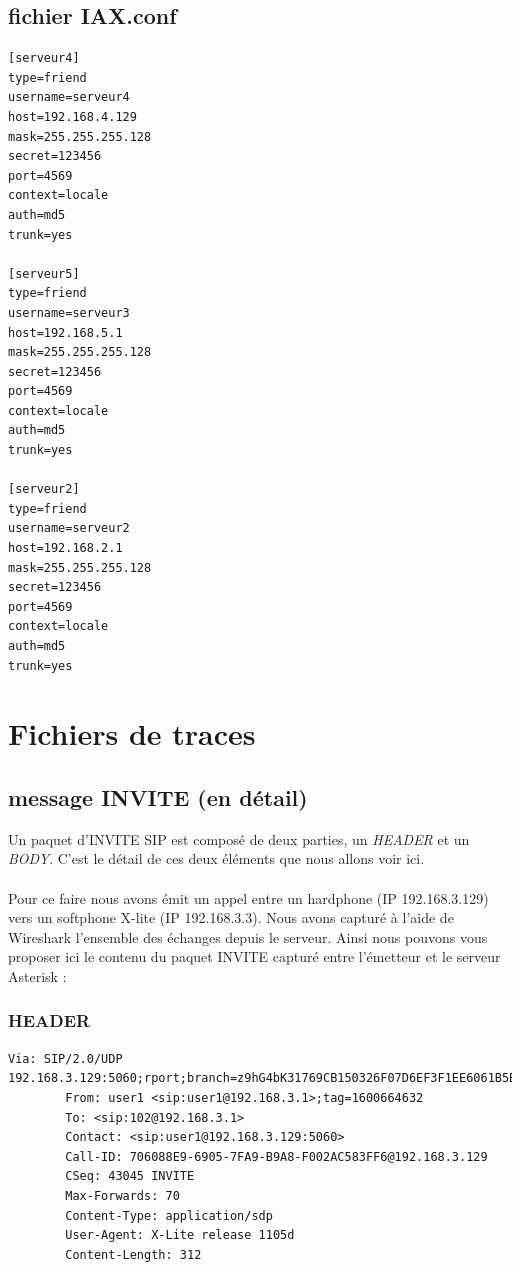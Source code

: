 \documentclass[12pt,a4paper,notitlepage]{article}
\begin{document}
\subsection{fichier IAX.conf}

\begin{lstlisting}[title=Fichier IAX.conf]
[serveur4]
type=friend
username=serveur4
host=192.168.4.129
mask=255.255.255.128
secret=123456
port=4569
context=locale
auth=md5
trunk=yes

[serveur5]
type=friend
username=serveur3
host=192.168.5.1
mask=255.255.255.128
secret=123456
port=4569
context=locale
auth=md5
trunk=yes

[serveur2]
type=friend
username=serveur2
host=192.168.2.1
mask=255.255.255.128
secret=123456
port=4569
context=locale
auth=md5
trunk=yes
\end{lstlisting}


\section{Fichiers de traces}
\subsection{message INVITE (en détail)}
Un paquet d'INVITE SIP est composé de deux parties, un \textit{HEADER} et un  \textit{BODY}. C'est le détail de ces deux éléments que nous allons voir ici. 

\paragraph{}Pour ce faire nous avons émit un appel entre un hardphone (IP 192.168.3.129) vers un softphone X-lite (IP 192.168.3.3). Nous avons capturé à l'aide de Wireshark l'ensemble des échanges depuis le serveur. Ainsi nous pouvons vous proposer ici le contenu du paquet INVITE capturé entre l'émetteur et le serveur Asterisk :
\subsubsection{HEADER}
\begin{lstlisting}[title=Contenu du HEADER d'un paquet INVITE de SIP]
 Via: SIP/2.0/UDP 192.168.3.129:5060;rport;branch=z9hG4bK31769CB150326F07D6EF3F1EE6061B5B
        From: user1 <sip:user1@192.168.3.1>;tag=1600664632
        To: <sip:102@192.168.3.1>
        Contact: <sip:user1@192.168.3.129:5060>
        Call-ID: 706088E9-6905-7FA9-B9A8-F002AC583FF6@192.168.3.129
        CSeq: 43045 INVITE
        Max-Forwards: 70
        Content-Type: application/sdp
        User-Agent: X-Lite release 1105d
        Content-Length: 312
\end{lstlisting}
\end{document}
